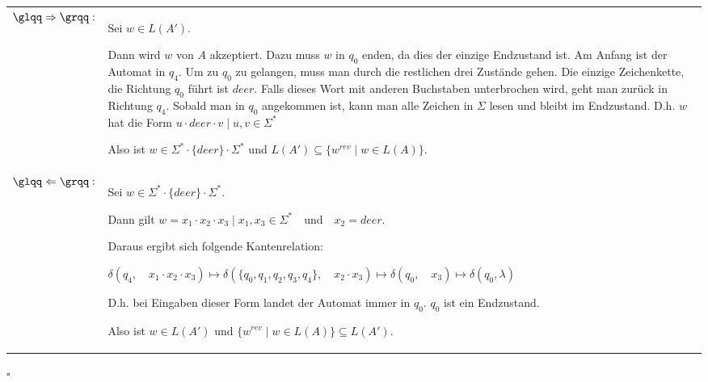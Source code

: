 \documentclass[12pt,a4paper]{../krautsourcing/homework}
\begin{document}
\begin{tabularx}{\linewidth}{@{}>{\bfseries}l@{\hspace{.5em}}X@{}}
    \(\glqq\Rightarrow\grqq:\) &
    Sei \(w \in L(A') \).

    Dann wird \(w\) von \(A\) akzeptiert. Dazu muss \(w\) in \(q_0\) enden, da dies der einzige Endzustand ist. Am Anfang ist der Automat in \(q_4\). Um zu \(q_0\) zu gelangen, muss man durch die restlichen drei Zustände gehen. Die einzige Zeichenkette, die Richtung \(q_0\) führt ist \(deer\). Falls dieses Wort mit anderen Buchstaben unterbrochen wird, geht man zurück in Richtung \(q_4\). Sobald man in \(q_0\) angekommen ist, kann man alle Zeichen in $\Sigma$ lesen und bleibt im Endzustand. D.h. \(w\) hat die Form  \( u \cdot deer \cdot v \mid u,v \in \Sigma^*\)

    Also ist \(w \in \Sigma^* \cdot \{deer\} \cdot \Sigma^* \) und \(L(A') \subseteq \lbrace w^{rev} \mid w \in L(A) \rbrace\).

     \\

    \(\glqq\Leftarrow\grqq:\) &
    Sei \(w \in \Sigma^* \cdot \{deer\} \cdot \Sigma^*\).

    Dann gilt \(w = x_1 \cdot x_2 \cdot x_3 \mid x_1,x_3 \in \Sigma^* \quad \textrm{und} \quad x_2 = deer \).
    
    Daraus ergibt sich folgende Kantenrelation:
    
    \( 
    \delta (q_4, \quad x_1 \cdot x_2 \cdot x_3) \mapsto 
    \delta (\{q_0,q_1,q_2,q_3,q_4 \}, \quad x_2 \cdot x_3) \mapsto
    \delta (q_0, \quad x_3) \mapsto 
    \delta (q_0, \lambda) 
    \)

    D.h. bei Eingaben dieser Form landet der Automat immer in  \(q_0\). \(q_0\) ist ein Endzustand.

	Also ist \(w \in L(A')\) und \(\lbrace w^{rev} \mid w \in L(A) \rbrace \subseteq L(A')\).	  
\end{tabularx}

\hfill \(\square\)
\end{document}
